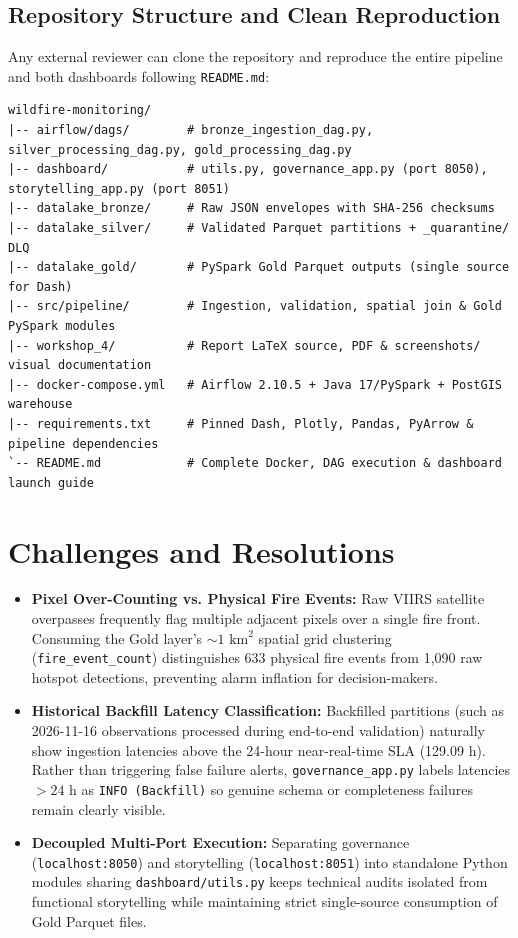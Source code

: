 \documentclass[11pt,a4paper]{article}
\begin{document}
\FloatBarrier

\subsection{Repository Structure and Clean Reproduction}
Any external reviewer can clone the repository and reproduce the entire pipeline and both dashboards following \texttt{README.md}:

\begin{lstlisting}
wildfire-monitoring/
|-- airflow/dags/        # bronze_ingestion_dag.py, silver_processing_dag.py, gold_processing_dag.py
|-- dashboard/           # utils.py, governance_app.py (port 8050), storytelling_app.py (port 8051)
|-- datalake_bronze/     # Raw JSON envelopes with SHA-256 checksums
|-- datalake_silver/     # Validated Parquet partitions + _quarantine/ DLQ
|-- datalake_gold/       # PySpark Gold Parquet outputs (single source for Dash)
|-- src/pipeline/        # Ingestion, validation, spatial join & Gold PySpark modules
|-- workshop_4/          # Report LaTeX source, PDF & screenshots/ visual documentation
|-- docker-compose.yml   # Airflow 2.10.5 + Java 17/PySpark + PostGIS warehouse
|-- requirements.txt     # Pinned Dash, Plotly, Pandas, PyArrow & pipeline dependencies
`-- README.md            # Complete Docker, DAG execution & dashboard launch guide
\end{lstlisting}

\section{Challenges and Resolutions}

\begin{itemize}[leftmargin=1.4em, itemsep=3pt]
    \item \textbf{Pixel Over-Counting vs. Physical Fire Events:} Raw VIIRS satellite overpasses frequently flag multiple adjacent pixels over a single fire front. Consuming the Gold layer's $\sim 1\text{ km}^2$ spatial grid clustering (\texttt{fire\_event\_count}) distinguishes 633 physical fire events from 1,090 raw hotspot detections, preventing alarm inflation for decision-makers.
    \item \textbf{Historical Backfill Latency Classification:} Backfilled partitions (such as 2026-11-16 observations processed during end-to-end validation) naturally show ingestion latencies above the 24-hour near-real-time SLA (129.09 h). Rather than triggering false failure alerts, \texttt{governance\_app.py} labels latencies $> 24\text{ h}$ as \texttt{INFO (Backfill)} so genuine schema or completeness failures remain clearly visible.
    \item \textbf{Decoupled Multi-Port Execution:} Separating governance (\texttt{localhost:8050}) and storytelling (\texttt{localhost:8051}) into standalone Python modules sharing \texttt{dashboard/utils.py} keeps technical audits isolated from functional storytelling while maintaining strict single-source consumption of Gold Parquet files.
\end{itemize}
\end{document}

